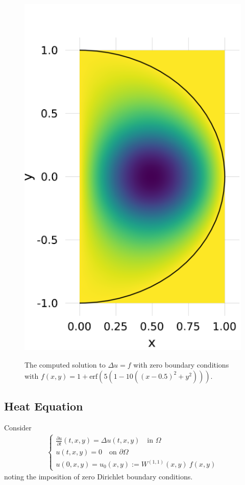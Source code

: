 \documentclass[11pt, oneside]{article}   	%
\newcommand{\Wii}{W^{(1,1)}}
\begin{document}
\begin{figure}
	\centering
	\includegraphics[scale=0.3]{solution}
        	\label{fig:solution}
    	\caption{The computed solution to $\Delta u = f$ with zero boundary conditions with $f(x,y) = 1 + \text{erf}(5(1 - 10((x - 0.5)^2 + y^2)))$.}
	\centering
\end{figure}

\subsection{Heat Equation}
Consider
\begin{align}
	\begin{cases}
		\frac{\partial u}{\partial t}(t,x,y) = \Delta u(t,x,y) \quad \text{in } \Omega \\
		u(t, x, y) = 0 \quad \text{on } \partial \Omega \\
		u(0, x, y) = u_0(x,y) := \Wii(x,y) \: f(x,y)
	\end{cases}
\end{align}
noting the imposition of zero Dirichlet boundary conditions.
\end{document}
